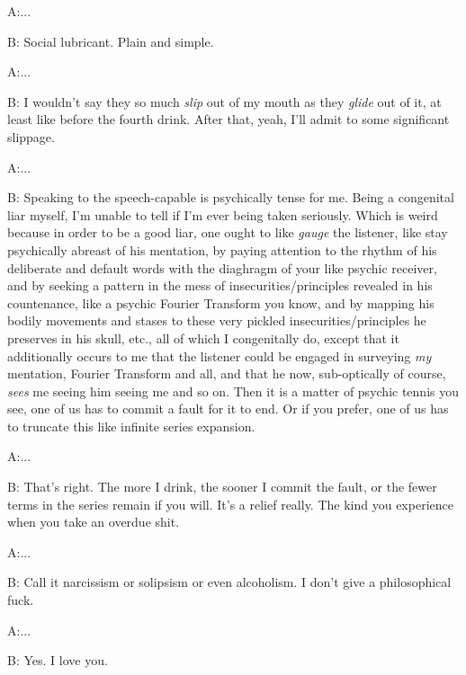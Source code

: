 \documentclass{article}
\begin{document}
\newline

A:...

B: Social lubricant. Plain and simple.
\newline
\newline

A:...

B: I wouldn't say they so much \textit{slip} out of my mouth as they
\textit{glide} out of it, at least like before the fourth drink. After
that, yeah, I'll admit to some significant slippage. \newline
\newline
\newline

A:...

B: Speaking to the speech-capable is psychically tense for me. Being
a congenital liar myself, I'm unable to tell if I'm ever being taken
seriously. Which is weird because in order to be a good liar, one ought
to like \textit{gauge} the listener, like stay psychically abreast of
his mentation, by paying attention to the rhythm of his deliberate and
default words with the diaghragm of your like psychic receiver, and by
seeking a pattern in the mess of insecurities/principles
revealed in his countenance, like a psychic Fourier Transform you know,
and by mapping his bodily movements and stases to these very pickled
insecurities/principles he preserves in his skull, etc., all of which
I congenitally do, except that it additionally occurs to me that the
listener could be engaged in surveying \textit{my} mentation,
Fourier Transform and all, and that he now, sub-optically of course,
\textit{sees} me seeing him seeing me and so on. Then it is a matter of
psychic tennis you see, one of us has to commit a fault for it to end.
Or if you prefer, one of us has to truncate this like infinite series
expansion. \newline \newline

A:...

B: That's right. The more I drink, the sooner I commit the fault, or the
fewer terms in the series remain if you will. It's a relief really. The
kind you experience when you take an overdue shit. \newline \newline

A:...

B: Call it narcissism or solipsism or even alcoholism. I don't give
a philosophical fuck.
\newline
\newline

A:...

B: Yes. I love you.
\newline
\newline
\end{document}
